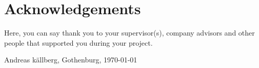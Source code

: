 \thispagestyle{plain}			%
\section*{Acknowledgements}
Here, you can say thank you to your supervisor(s), company advisors and other people that supported you during your project.

\vspace{1.5cm}
\hfill
Andreas källberg, Gothenburg, \today

\newpage				%
\thispagestyle{empty}
\mbox{}

